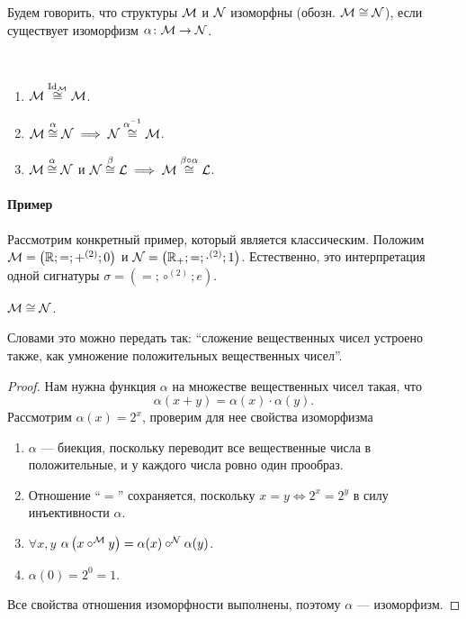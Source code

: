 \begin{definition}
    Будем говорить, что структуры $\mathcal{M}$ и $\mathcal{N}$ изоморфны (обозн. $\mathcal{M} \cong \mathcal{N}$), если существует изоморфизм $\alpha \colon \mathcal{M} \to \mathcal{N}$.
\end{definition}

\begin{statement}~
    \begin{enumerate}
        \item $\mathcal{M} \overset{\mathrm{Id}_{\mathcal{M}}}{\cong} \mathcal{M}$.
        \item $\mathcal{M} \overset{\alpha}{\cong} \mathcal{N} \implies \mathcal{N} \overset{\alpha^{-1}}{\cong} \mathcal{M}$.
        \item $\mathcal{M} \overset{\alpha}{\cong} \mathcal{N}$ и $\mathcal{N} \overset{\beta}{\cong} \mathcal{L} \implies \mathcal{M} \overset{\beta \circ \alpha}{\cong} \mathcal{L}$.
    \end{enumerate}
\end{statement}

\paragraph{Пример}
Рассмотрим конкретный пример, который является классическим.
Положим $\mathcal{M} = \left( \mathbb{R}; =; +^{(2)}; 0 \right)$ и $\mathcal{N} = \left( \mathbb{R}_{+}; =; \cdot^{(2)}; 1 \right)$.
Естественно, это интерпретация одной сигнатуры $\sigma = \left( =; \circ^{(2)}; e \right)$.
\begin{statement}
    $\mathcal{M} \cong \mathcal{N}$.
\end{statement}
Словами это можно передать так: \enquote{сложение вещественных чисел устроено также, как умножение положительных вещественных чисел}.
\begin{proof}
    Нам нужна функция $\alpha$ на множестве вещественных чисел такая, что
    $$
        \alpha(x + y) = \alpha(x) \cdot \alpha(y).
    $$
    Рассмотрим $\alpha(x) = 2^{x}$, проверим для нее свойства изоморфизма
    \begin{enumerate}
        \item $\alpha$ --- биекция, поскольку переводит все вещественные числа в положительные, и у каждого числа ровно один прообраз.
        \item Отношение \enquote{$=$} сохраняется, поскольку $x = y \iff 2^{x} = 2^{y}$ в силу инъективности $\alpha$.
        \item $\forall x, y$ $\alpha\left(x \circ^{\mathcal{M}} y\right) = \alpha(x) \circ^{\mathcal{N}} \alpha(y)$.
        \item $\alpha(0) = 2^{0} = 1$.
    \end{enumerate}
    Все свойства отношения изоморфности выполнены, поэтому $\alpha$ --- изоморфизм.
\end{proof}

